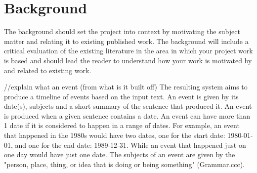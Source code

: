 \chapter{Background}
The background should set the project into context by motivating the subject matter and relating it to existing published work. The background will include a critical evaluation of the existing literature in the area in which your project work is based and should lead the reader to understand how your work is motivated by and related to existing work.

//explain what an event (from what is it built off)
The resulting system aims to produce a timeline of events based on the input text. An event is given by its date(s), subjects and a short summary of the sentence that produced it. An event is produced when a given sentence contains a date. An event can have more than 1 date if it is considered to happen in a range of dates. For example, an event that happened in the 1980s would have two dates, one for the start date: 1980-01-01, and one for the end date: 1989-12-31. While an event that happened just on one day would have just one date. The subjects of an event are given by the "person, place, thing, or idea that is doing or being something" (Grammar.ccc).

